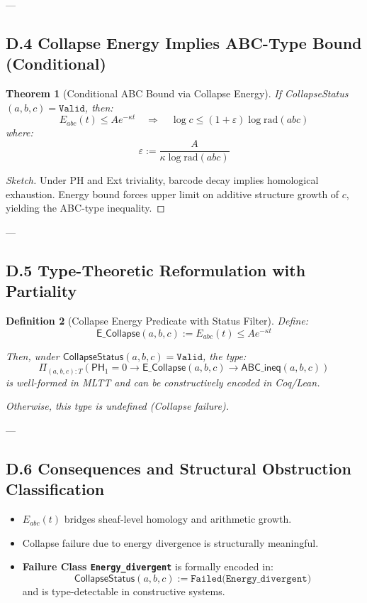 \documentclass[11pt]{article}
\newtheorem{theorem}{Theorem}[section]
\newtheorem{definition}[theorem]{Definition}
\begin{document}
---

\subsection*{D.4 Collapse Energy Implies ABC-Type Bound (Conditional)}

\begin{theorem}[Conditional ABC Bound via Collapse Energy]
If CollapseStatus\( (a,b,c) = \texttt{Valid} \), then:
\[
E_{abc}(t) \leq A e^{-\kappa t} \quad \Rightarrow \quad \log c \leq (1 + \varepsilon) \log \mathrm{rad}(abc)
\]
where:
\[
\varepsilon := \frac{A}{\kappa \log \mathrm{rad}(abc)}
\]
\end{theorem}

\begin{proof}[Sketch]
Under PH and Ext triviality, barcode decay implies homological exhaustion.  
Energy bound forces upper limit on additive structure growth of \( c \), yielding the ABC-type inequality.
\end{proof}

---

\subsection*{D.5 Type-Theoretic Reformulation with Partiality}

\begin{definition}[Collapse Energy Predicate with Status Filter]
Define:
\[
\mathsf{E\_Collapse}(a,b,c) := E_{abc}(t) \leq A e^{-\kappa t}
\]

Then, under \( \mathsf{CollapseStatus}(a,b,c) = \texttt{Valid} \), the type:
\[
\Pi_{(a,b,c):T} \left(
  \mathsf{PH}_1 = 0 \to \mathsf{E\_Collapse}(a,b,c) \to \mathsf{ABC\_ineq}(a,b,c)
\right)
\]
is well-formed in MLTT and can be constructively encoded in Coq/Lean.

Otherwise, this type is undefined (Collapse failure).
\end{definition}

---

\subsection*{D.6 Consequences and Structural Obstruction Classification}

\begin{itemize}
  \item \( E_{abc}(t) \) bridges sheaf-level homology and arithmetic growth.
  \item Collapse failure due to energy divergence is structurally meaningful.
  \item \textbf{Failure Class \texttt{Energy\_divergent}} is formally encoded in:
  \[
  \mathsf{CollapseStatus}(a,b,c) := \texttt{Failed(Energy\_divergent)}
  \]
  and is type-detectable in constructive systems.
\end{itemize}
\end{document}
